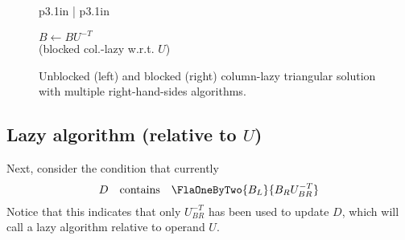 \begin{figure}[htbp]
\begin{center}
\begin{tabular}{p{3.1in} | p{3.1in}}
\begin{minipage}{3.1in}
\begin{algorithm}{
\label{alg:blocked_collazy_utrsm}
\begin{minipage}[t]{2in}
$ B \leftarrow BU^{-T} $ \\(blocked col.-lazy w.r.t. $ U $)
\end{minipage}
}
\begin{minipage}{4in}
\end{minipage}
\end{algorithm}
\end{minipage}
\end{tabular}
\end{center}
\caption{Unblocked (left) and blocked (right) column-lazy triangular solution with
multiple right-hand-sides
algorithms.}
\label{fig:utrsm:collazy_alg}
\end{figure}

\subsection{Lazy algorithm (relative to $ U $)}

Next, consider the condition that currently 
\begin{equation}
\label{eqn:teaml_ltrmm4}
D \quad \mbox{contains}
\quad
\FlaOneByTwo{ B_L }
            { B_R U_{BR}^{-T} }
\end{equation}
Notice that this indicates that only 
$ U_{BR}^{-T} $ has been used
to update $ D $, which will call
a lazy algorithm relative to operand
$ U $.

